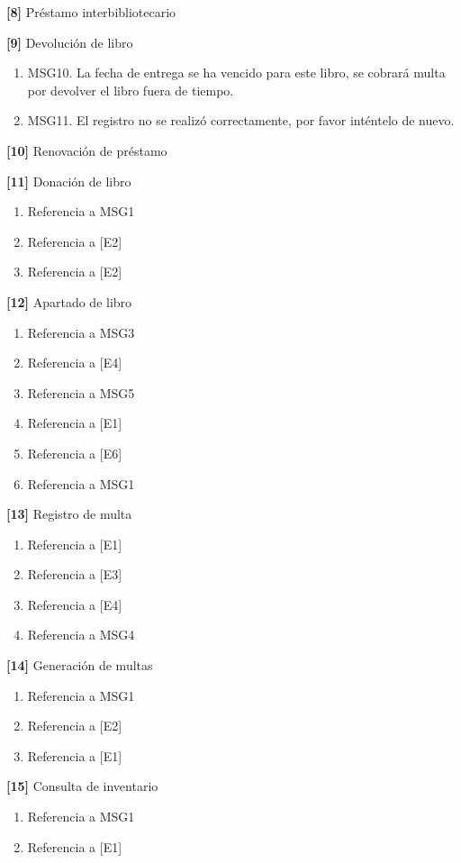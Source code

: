 \begin{Citemize}
\begin{enumerate}
		\end{enumerate}
	\item {\bf [8]} Préstamo interbibliotecario
	\item {\bf [9]} Devolución de libro
		\begin{enumerate}
			\item MSG10. La fecha de entrega se ha vencido para este libro, se cobrará multa por devolver el libro fuera de tiempo.
			\item MSG11. El registro no se realizó correctamente, por favor inténtelo de nuevo.
		\end{enumerate}
	\item {\bf [10]} Renovación de préstamo
	\item {\bf [11]} Donación de libro
		\begin{enumerate}
			\item Referencia a MSG1
			\item Referencia a [E2]
			\item Referencia a [E2]
		\end{enumerate}
	\item {\bf [12]} Apartado de libro
		\begin{enumerate}
			\item Referencia a MSG3
			\item Referencia a [E4]
			\item Referencia a MSG5
			\item Referencia a [E1]
			\item Referencia a [E6]
			\item Referencia a MSG1
		\end{enumerate}
	\item {\bf [13]} Registro de multa
		\begin{enumerate}
			\item Referencia a [E1]
			\item Referencia a [E3]
			\item Referencia a [E4]
			\item Referencia a MSG4
		\end{enumerate}
	\item {\bf [14]} Generación de multas
		\begin{enumerate}
			\item Referencia a MSG1
			\item Referencia a [E2]
			\item Referencia a [E1]
		\end{enumerate}
	\item {\bf [15]} Consulta de inventario
		\begin{enumerate}
			\item Referencia a MSG1
			\item Referencia a [E1]
		\end{enumerate}
	\end{Citemize}
